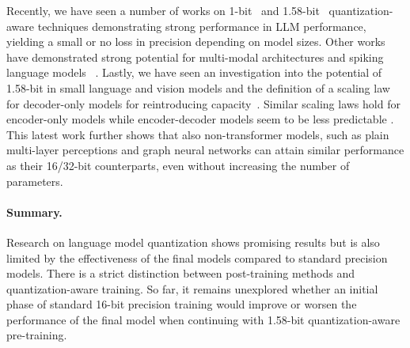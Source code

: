 Recently, we have seen a number of works on 1-bit~\citep{wang2023bitnet} and 1.58-bit~\citep{ma2024era} quantization-aware techniques demonstrating strong performance in LLM performance, yielding a small or no loss in precision depending on model sizes. Other works have demonstrated strong potential for multi-modal architectures \citep{sundaram2024llavaolmobitnet1b} and spiking language models ~\citep{bal2024exploring}. 
Lastly, we have seen an investigation into the potential of 1.58-bit in small language and vision models and the definition of a scaling law for decoder-only models for reintroducing capacity~\citep{nielsen2024bitnetb158reloadedstateoftheart}. Similar scaling laws hold for encoder-only models while encoder-decoder models seem to be less predictable \citep{bitsenoughbottomup}. This latest work further shows that also non-transformer models, such as plain multi-layer perceptions and graph neural networks can attain similar performance as their 16/32-bit counterparts, even without increasing the number of parameters.

\paragraph{Summary.}
Research on language model quantization shows promising results but is also limited by the effectiveness of the final models compared to standard precision models. There is a strict distinction between post-training methods and quantization-aware training. So far, it remains unexplored whether an initial phase of standard 16-bit precision training would improve or worsen the performance of the final model when continuing with 1.58-bit quantization-aware pre-training.
